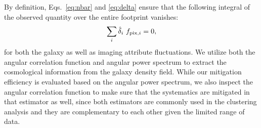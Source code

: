 By definition, Eqs.~\ref{eq:nbar} and \ref{eq:delta} ensure that the following integral of the observed quantity over the entire footprint vanishes:
\begin{align}\label{eq:ic}
    \sum_{i} \hat{\delta}_{i}~f_{{\rm pix},i} = 0,
\end{align}
for both the galaxy as well as imaging attribute fluctuations. We utilize both the angular correlation function and angular power spectrum to extract the cosmological information from the galaxy density field. While our mitigation efficiency is evaluated based on the angular power spectrum, we also inspect the angular correlation function to make sure that the systematics are mitigated in that estimator as well, since both estimators are commonly used in the clustering analysis and they are complementary to each other given the limited range of data.


